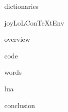
\usemodule[t-diSimp]

\startDiSimpComponent dictionaries

\diSimpEnvironment joyLoLConTeXtEnv

\startJoyLoLCoAlg[title=Dictionaries][dictionaries]

\diSimpComponent overview

\diSimpComponent code

\diSimpComponent words

\diSimpComponent lua

\diSimpComponent conclusion

\stopJoyLoLCoAlg

\stopDiSimpComponent
